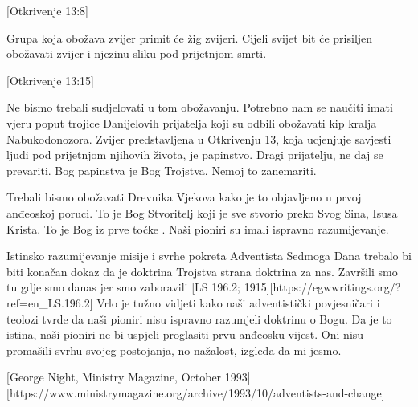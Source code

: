 [Otkrivenje 13:8]

Grupa koja obožava zvijer primit će žig zvijeri. Cijeli svijet bit će prisiljen obožavati zvijer i njezinu sliku pod prijetnjom smrti.

[Otkrivenje 13:15]

Ne bismo trebali sudjelovati u tom obožavanju. Potrebno nam se naučiti imati vjeru poput trojice Danijelovih prijatelja koji su odbili obožavati kip kralja Nabukodonozora. Zvijer predstavljena u Otkrivenju 13, koja ucjenjuje savjesti ljudi pod prijetnjom njihovih života, je papinstvo. Dragi prijatelju, ne daj se prevariti. Bog papinstva je Bog Trojstva. Nemoj to zanemariti.

Trebali bismo obožavati Drevnika Vjekova kako je to objavljeno u prvoj anđeoskoj poruci. To je Bog Stvoritelj koji je sve stvorio preko Svog Sina, Isusa Krista. To je Bog iz prve točke . Naši pioniri su imali ispravno razumijevanje.

Istinsko razumijevanje misije i svrhe pokreta Adventista Sedmoga Dana trebalo bi biti konačan dokaz da je doktrina Trojstva strana doktrina za nas. Završili smo tu gdje smo danas jer smo zaboravili [LS 196.2; 1915][https://egwwritings.org/?ref=en\_LS.196.2] Vrlo je tužno vidjeti kako naši adventistički povjesničari i teolozi tvrde da naši pioniri nisu ispravno razumjeli doktrinu o Bogu. Da je to istina, naši pioniri ne bi uspjeli proglasiti prvu anđeosku vijest. Oni nisu promašili svrhu svojeg postojanja, no nažalost, izgleda da mi jesmo.

[George Night, Ministry Magazine, October 1993][https://www.ministrymagazine.org/archive/1993/10/adventists-and-change]





